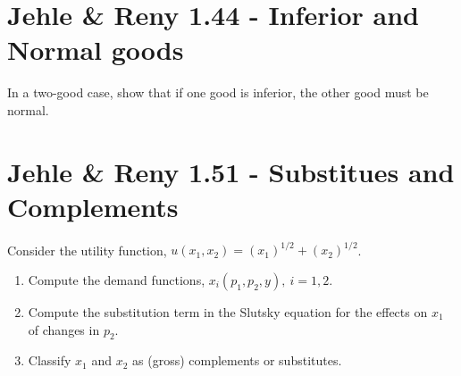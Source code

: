 \documentclass{article}
\begin{document}
\subsection{}

















\section{Jehle \& Reny 1.44 - Inferior and Normal goods}
In a two-good case, show that if one good is inferior, the other good must be normal.




\section{Jehle \& Reny 1.51 - Substitues and Complements}
Consider the utility function, $u(x_1, x_2) = (x_1)^{1/2} + (x_2)^{1/2}$.

\begin{enumerate}[label=\alph*.]

\item Compute the demand functions, $x_i(p_1, p_2, y), \ i = 1, 2$.

\item Compute the substitution term in the Slutsky equation for the effects on $x_1$ of changes in $p_2$.

\item Classify $x_1$ and $x_2$ as (gross) complements or substitutes.

\end{enumerate}
\end{document}
